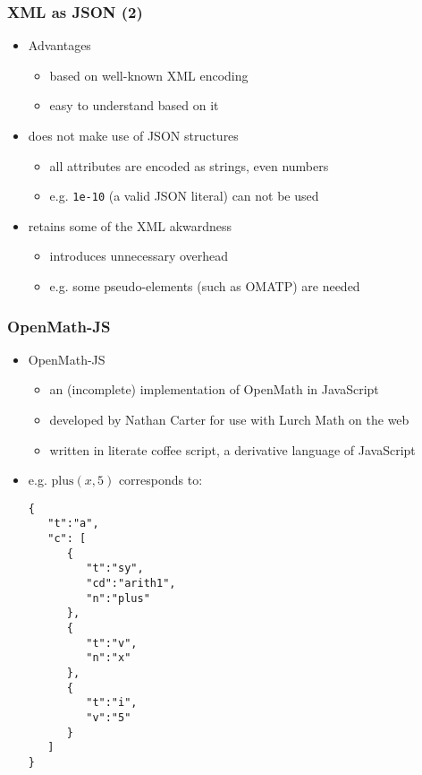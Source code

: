 \documentclass[usenames,dvipsnames]{beamer}
\makeatletter
\let\lstinline@org\lstinline
\def\lstinline{\lstinline@org[basicstyle=\ttfamily]}
\makeatother
\begin{document}
\begin{frame}[fragile]
    \frametitle{XML as JSON (2)}
    \begin{itemize}
        \item Advantages
        \begin{itemize}
            \item based on well-known XML encoding
            \item easy to understand based on it
        \end{itemize} 
        \item does not make use of JSON structures
        \begin{itemize}
            \item all attributes are encoded as strings, even numbers
            \item e.g. \lstinline{1e-10} (a valid JSON literal) can not be used
        \end{itemize}
        \item retains some of the XML akwardness
        \begin{itemize}
            \item introduces unnecessary overhead
            \item e.g. some pseudo-elements (such as OMATP) are needed
        \end{itemize}
    \end{itemize}
\end{frame}


\begin{frame}[fragile]
    \frametitle{OpenMath-JS}%
    \begin{itemize}
        \item OpenMath-JS
        \begin{itemize}
            \item an (incomplete) implementation of OpenMath in JavaScript
            \item developed by Nathan Carter for use with Lurch Math on the web
            \item written in literate coffee script, a derivative language of JavaScript
        \end{itemize}
        \item e.g. $\mathrm{plus}(x, 5)$ corresponds to:
        \begin{lstlisting}
{  
   "t":"a",
   "c": [  
      {  
         "t":"sy",
         "cd":"arith1",
         "n":"plus"
      },
      {  
         "t":"v",
         "n":"x"
      },
      {  
         "t":"i",
         "v":"5"
      }
   ]
}
\end{lstlisting}
    \end{itemize}
\end{frame}
\end{document}
